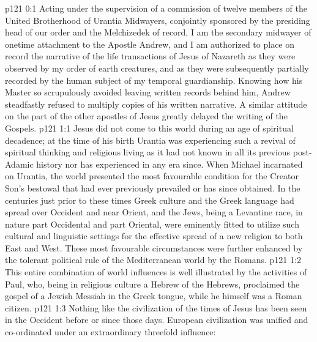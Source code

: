 \author{Midwayer Commission}
\vs p121 0:1 Acting under the supervision of a commission of twelve members of the United Brotherhood of Urantia Midwayers, conjointly sponsored by the presiding head of our order and the Melchizedek of record, I am the secondary midwayer of onetime attachment to the Apostle Andrew, and I am authorized to place on record the narrative of the life transactions of Jesus of Nazareth as they were observed by my order of earth creatures, and as they were subsequently partially recorded by the human subject of my temporal guardianship. Knowing how his Master so scrupulously avoided leaving written records behind him, Andrew steadfastly refused to multiply copies of his written narrative. A similar attitude on the part of the other apostles of Jesus greatly delayed the writing of the Gospels.
\vs p121 1:1 Jesus did not come to this world during an age of spiritual decadence; at the time of his birth Urantia was experiencing such a revival of spiritual thinking and religious living as it had not known in all its previous post\hyp{}Adamic history nor has experienced in any era since. When Michael incarnated on Urantia, the world presented the most favourable condition for the Creator Son’s bestowal that had ever previously prevailed or has since obtained. In the centuries just prior to these times Greek culture and the Greek language had spread over Occident and near Orient, and the Jews, being a Levantine race, in nature part Occidental and part Oriental, were eminently fitted to utilize such cultural and linguistic settings for the effective spread of a new religion to both East and West. These most favourable circumstances were further enhanced by the tolerant political rule of the Mediterranean world by the Romans.
\vs p121 1:2 This entire combination of world influences is well illustrated by the activities of Paul, who, being in religious culture a Hebrew of the Hebrews, proclaimed the gospel of a Jewish Messiah in the Greek tongue, while he himself was a Roman citizen.
\vs p121 1:3 Nothing like the civilization of the times of Jesus has been seen in the Occident before or since those days. European civilization was unified and co\hyp{}ordinated under an extraordinary threefold influence:
